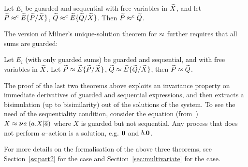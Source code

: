 \begin{theorem}
\label{t:Mil89s3}
Let $E_i$ be guarded and sequential with free
variables in $\widetilde X$, and let ${\widetilde P} \mathrel{\approx^{\rm{c}}} {\widetilde E}\{\widetilde P /\widetilde X\}$,
  ${\widetilde Q} \mathrel{\approx^{\rm{c}}} {\widetilde E}\{\widetilde Q /\widetilde X\}$. Then ${\widetilde P} \mathrel{\approx^{\rm{c}}} {\widetilde Q}$.
\end{theorem}

The version of Milner's unique-solution theorem for $\approx$ further requires
that all sums are guarded:
\begin{theorem}
\label{t:Mil89}
Let $E_i$ (with only guarded sums) be guarded and sequential,
and  with free
variables in $\widetilde X$. Let ${\widetilde P} \approx {\widetilde E}\{\widetilde P /\widetilde X\}$,
  ${\widetilde Q} \approx {\widetilde E}\{\widetilde Q /\widetilde X\}$, then ${\widetilde P} \approx {\widetilde Q}$.
\end{theorem}

The proof of the last two theorems above exploits an invariance
property on immediate derivatives
of guarded and sequential expressions, and then extracts a bisimulation
(up to bisimilarity) out of the solutions of the system.
To see the need of the sequentiality condition, consider
 the equation (from~\cite{Mil89}) $X \approx {\boldsymbol \nu} a\: (a. X | \overline{a})$
where $X$ is guarded but not sequential. Any process that does not perform
$a$--action is a solution, e.g. ${\boldsymbol 0}$ and $b.{\boldsymbol 0}$.

For more details on the formalisation of the above three theorems, see Section~\ref{ss:part2}
for the \univariate case and Section~\ref{sec:multivariate} for the \multivariate case.

